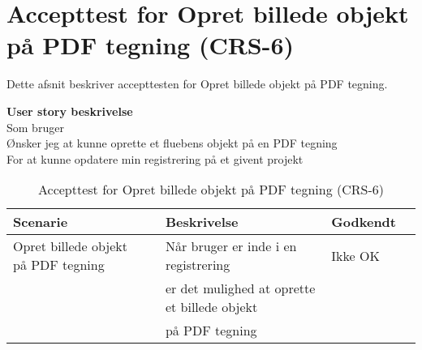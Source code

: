 \section{Accepttest for Opret billede objekt på PDF tegning (CRS-6)}
Dette afsnit beskriver accepttesten for Opret billede objekt på PDF tegning.

\textbf{User story beskrivelse} \\
Som bruger \\
Ønsker jeg at kunne oprette et fluebens objekt på en PDF tegning \\
For at kunne opdatere min registrering på et givent projekt

\begin{table}[H]
	\centering
	\begin{tabular}{|ll|l|ll|} \hline
		\textbf{Scenarie} &  & \textbf{Beskrivelse}&  \textbf{Godkendt}&  \\ \hline
		Opret billede objekt på PDF tegning&  &  Når bruger er inde i en registrering &  Ikke OK&  \\
		& & er det mulighed at oprette et billede objekt& & \\ 
		& & på PDF tegning& & \\ \hline
	\end{tabular}
	\caption{Accepttest for Opret billede objekt på PDF tegning (CRS-6)}
	\label{AcceptBillede}
\end{table}

\clearpage